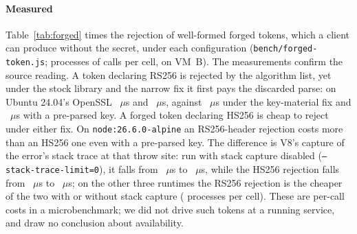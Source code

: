 \documentclass[preprint,12pt,authoryear]{elsarticle}
\begin{document}
\paragraph{Measured} Table~\ref{tab:forged} times the rejection of well-formed
forged tokens, which a client can produce without the secret, under each
configuration (\texttt{bench/forged-token.js}; \ForgedInvocations{} processes
of \ForgedCalls{} calls per cell, on VM~B). The measurements confirm the source
reading. A token declaring RS256 is rejected by the algorithm list, yet under
the stock library and the narrow fix it first pays the discarded parse: on
Ubuntu 24.04's OpenSSL \ForgedUbuntuOpenssl{} \ForgedUbuntuRsString~$\mu$s and
\ForgedUbuntuRsSafe~$\mu$s, against \ForgedUbuntuRsKeyonly~$\mu$s under the
key-material fix and \ForgedUbuntuRsPreparsed~$\mu$s with a pre-parsed key. A
forged token declaring HS256 is cheap to reject under either fix. On
\texttt{node:26.6.0-alpine} an RS256-header rejection costs more than an HS256
one even with a pre-parsed key. The difference is V8's capture of the error's
stack trace at that throw site: run with stack capture disabled
(\texttt{--stack-trace-limit=0}), it falls from \RejTwentySixRsStack~$\mu$s to
\RejTwentySixRsNoStack~$\mu$s, while the HS256 rejection falls from
\RejTwentySixHsStack~$\mu$s to \RejTwentySixHsNoStack~$\mu$s; on the other three
runtimes the RS256 rejection is the cheaper of the two with or without stack
capture (\RejInvocations{} processes per cell). These are per-call costs in a
microbenchmark; we did not drive such tokens at a running service, and draw no
conclusion about availability.
\end{document}
